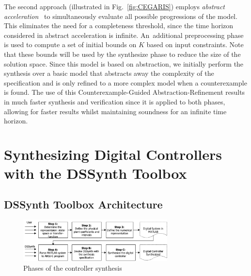 \documentclass[conference]{IEEEtran}
\newcommand\tool{{DSSynth Toolbox}\xspace}
\begin{document}
The second approach (illustrated in
Fig.~\ref{fig:CEGARIS}) employs {\em abstract
acceleration}~\cite{cattaruzza2015unbounded} to simultaneously evaluate all
possible progressions of the model.  This eliminates the need for a
completeness threshold, since the time horizon considered in abstract
acceleration is infinite.  An~additional preprocessing phase is used to
compute a set of initial bounds on $K$ based on input constraints.  Note
that these bounds will be used by the {\sc synthesize} phase to reduce the
size of the solution space.
%
Since this model is based on abstraction, we initially perform the synthesis
over a basic model that abstracts away the complexity of the specification
and is only refined to a more complex model when a counterexample is found.
%
%
The use of this Counterexample-Guided Abstraction-Refinement results in much
faster synthesis and verification since it is applied to both phases,
allowing for faster results whilst maintaining soundness for an infinite
time horizon.
 

\section{Synthesizing Digital Controllers with the \tool}

\subsection{\tool Architecture}

\begin{figure}[t]
\centering
\includegraphics[width=0.7\textwidth]{synthesis-flow.pdf}
\caption{Phases of the controller synthesis}
\label{fig:synthesis-flow}
\end{figure}
\end{document}
